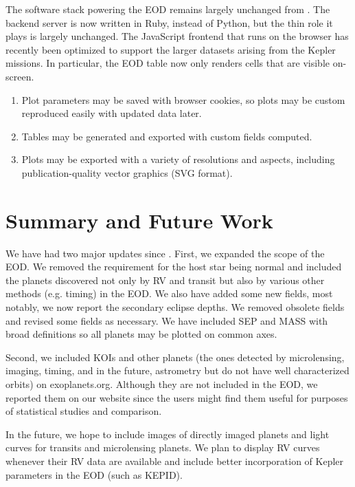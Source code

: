 \documentclass[11pt,preprint]{aastex}
\begin{document}
\begin{CJK*}{UTF8}{gbsn}
The software stack powering the EOD remains largely unchanged from
\cite{Wright2011}. The backend server is now written in Ruby, instead
of Python, but the thin role it plays is largely unchanged.  The
JavaScript frontend that runs on the browser has recently been
optimized to support the larger datasets arising from the Kepler
missions.  In particular, the EOD table now only renders cells that
are visible on-screen. 
\begin{enumerate}
\item Plot parameters may be saved with browser cookies, so plots may be custom reproduced easily with updated data later.
\item Tables may be generated and exported with custom fields computed.
\item Plots may be exported with a variety of resolutions and aspects, including publication-quality vector graphics (SVG format). 
\end{enumerate}

\section{Summary and Future Work}\label{sec:summary}

We have had two major updates since \cite{Wright2011}. First, we
expanded the scope of the EOD. We removed the requirement for the host
star being normal and included the planets discovered not only by RV
and transit but also by various other methods (e.g. timing) in the
EOD. We also have added some new fields, most notably, we now report
the secondary eclipse depths. We removed obsolete fields and revised
some fields as necessary. We have included SEP and MASS with broad definitions so all planets may be plotted on common axes.

Second, we included KOIs and other planets (the ones detected by
microlensing, imaging, timing, and in the future, astrometry but do not have well characterized orbits) on
exoplanets.org. Although they are not included in the EOD, we reported
them on our website since the users might find them useful for
purposes of statistical studies and comparison.

In the future, we hope to include images of directly imaged planets
and light curves for transits and
microlensing planets. We plan to display RV curves whenever their RV
data are available and include better incorporation of Kepler
parameters in the EOD (such as KEPID). 


\end{CJK*}
\end{document}
